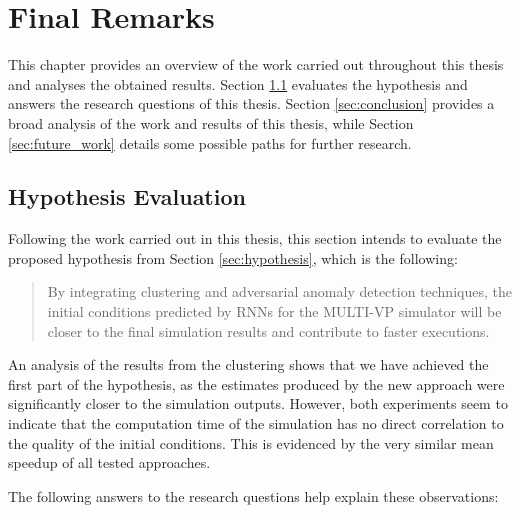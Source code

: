 \chapter{Final Remarks} \label{chap:remarks}
This chapter provides an overview of the work carried out throughout this thesis and analyses the obtained results. Section \ref{sec:hypothesis_eval} evaluates the hypothesis and answers the research questions of this thesis. Section \ref{sec:conclusion} provides a broad analysis of the work and results of this thesis, while Section \ref{sec:future_work} details some possible paths for further research.

\section{Hypothesis Evaluation}\label{sec:hypothesis_eval}
Following the work carried out in this thesis, this section intends to evaluate the proposed hypothesis from Section \ref{sec:hypothesis}, which is the following:

\begin{quote}
    By integrating clustering and adversarial anomaly detection techniques, the initial conditions predicted by RNNs for the MULTI-VP simulator will be closer to the final simulation results and contribute to faster executions.
\end{quote}

An analysis of the results from the clustering shows that we have achieved the first part of the hypothesis, as the estimates produced by the new approach were significantly closer to the simulation outputs. However, both experiments seem to indicate that the computation time of the simulation has no direct correlation to the quality of the initial conditions. This is evidenced by the very similar mean speedup of all tested approaches. 


The following answers to the research questions help explain these observations:
 
